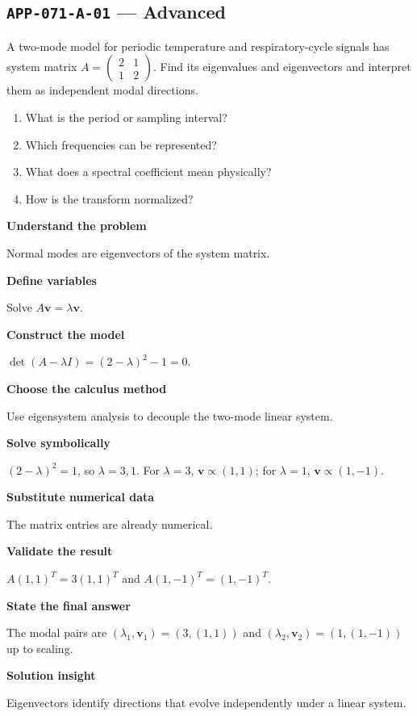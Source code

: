 \documentclass[11pt]{book}
\newcommand{\pid}[1]{\texttt{#1}}
\begin{document}
\subsection*{\pid{APP-071-A-01} — Advanced}
\begin{problembox}
A two-mode model for periodic temperature and respiratory-cycle signals has system matrix $A=\begin{pmatrix}2&1\\1&2\end{pmatrix}$. Find its eigenvalues and eigenvectors and interpret them as independent modal directions.
\end{problembox}
\begin{promptbox}\begin{enumerate}
\item What is the period or sampling interval?
\item Which frequencies can be represented?
\item What does a spectral coefficient mean physically?
\item How is the transform normalized?
\end{enumerate}\end{promptbox}
\begin{solutionbox}
\textbf{Understand the problem}\par Normal modes are eigenvectors of the system matrix.\par\medskip
\textbf{Define variables}\par Solve $A\mathbf v=\lambda\mathbf v$.\par\medskip
\textbf{Construct the model}\par $\det(A-\lambda I)=(2-\lambda)^2-1=0$.\par\medskip
\textbf{Choose the calculus method}\par Use eigensystem analysis to decouple the two-mode linear system.\par\medskip
\textbf{Solve symbolically}\par $(2-\lambda)^2=1$, so $\lambda=3,1$. For $\lambda=3$, $\mathbf v\propto(1,1)$; for $\lambda=1$, $\mathbf v\propto(1,-1)$.\par\medskip
\textbf{Substitute numerical data}\par The matrix entries are already numerical.\par\medskip
\textbf{Validate the result}\par $A(1,1)^T=3(1,1)^T$ and $A(1,-1)^T=(1,-1)^T$.\par\medskip
\textbf{State the final answer}\par The modal pairs are $(\lambda_1,\mathbf v_1)=(3,(1,1))$ and $(\lambda_2,\mathbf v_2)=(1,(1,-1))$ up to scaling.\par\medskip
\textbf{Solution insight}\par Eigenvectors identify directions that evolve independently under a linear system.\par\medskip
\end{solutionbox}
\end{document}
